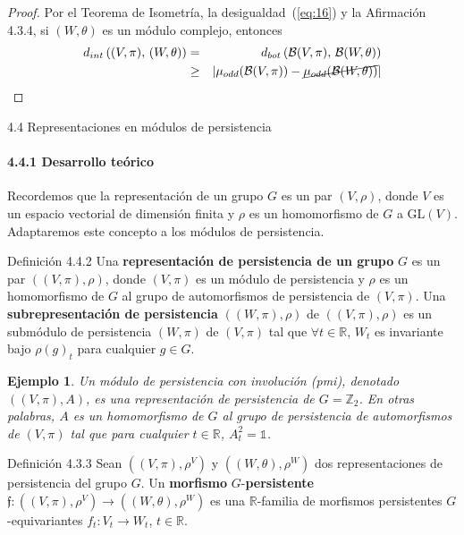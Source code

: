\documentclass{beamer}
\newtheorem{example2}[theorem]{Ejemplo}
\begin{document}
\begin{frame}
\begin{proof}
Por el Teorema de Isometr\'ia, la desigualdad~(\ref{eq:16}) y la Afirmaci\'on 4.3.4, si $(W,\theta)$ es un m\'odulo complejo, entonces
\begin{eqnarray*}
d_{int}\left((V,\pi),\,(W,\theta) \right)&=& d_{bot}\left( \mathcal{B}(V,\pi),\,\mathcal{B}(W,\theta)\right)\\
&\geq& |\mu_{odd}(\mathcal{B}(V,\pi))-\cancel{\mu_{odd}(\mathcal{B}(W,\theta))}|
\end{eqnarray*}
\end{proof}
\end{frame}


\begin{frame}{4.4 Representaciones en m\'odulos de persistencia}
\framesubtitle{4.4.1 Desarrollo te\'orico}
Recordemos que la representaci\'on de un grupo $G$ es un par $(V,\rho)$, donde $V$ es un espacio vectorial de dimensi\'on finita y $\rho$ es un homomorfismo de $G$ a $\mbox{GL}(V)$. Adaptaremos este concepto a los m\'odulos de persistencia.\\
\vspace{1em}
\begin{block}{Definici\'on 4.4.2}
Una {\bfseries representaci\'on de persistencia de un grupo} $G$ es un par $\left((V,\pi),\rho\right)$, donde $(V,\pi)$ es un m\'odulo de persistencia y $\rho$ es un homomorfismo de $G$ al grupo de automorfismos de persistencia de $(V,\pi)$. Una {\bfseries subrepresentaci\'on de persistencia} $\left( (W,\pi),\rho\right)$ de $\left((V,\pi),\rho\right)$ es un subm\'odulo de persistencia $(W,\pi)$ de $(V,\pi)$ tal que $\forall t\in \mathbb{R}$, $W_t$ es invariante bajo $\rho(g)_t$ para cualquier $g\in G$.
\end{block}
\end{frame}

\begin{frame}
\begin{example2}Un \emph{m\'odulo de persistencia con involuci\'on} (pmi), denotado $((V,\pi),A)$, es una representaci\'on de persistencia de $G=\mathbb{Z}_2$. En otras palabras, $A$ es un homomorfismo de $G$ al grupo de persistencia de automorfismos de $(V,\pi)$ tal que para cualquier $t\in \mathbb{R}$, $A_t^2=\mathbb{1}$. 
\end{example2}
\vspace{1em}
\begin{block}{Definici\'on 4.3.3}
Sean $((V,\pi),\rho^V)$ y $((W,\theta),\rho^W)$ dos representaciones de persistencia del grupo $G$. Un {\bfseries morfismo} $G$-{\bfseries persistente} $\mathfrak{f}:((V,\pi),\rho^V)\rightarrow ((W,\theta),\rho^W)$ es una $\mathbb{R}$-familia de morfismos persistentes $G$-equivariantes $f_t:V_t\rightarrow W_t$, $t\in \mathbb{R}$.
\end{block}
\end{frame}
\end{document}
